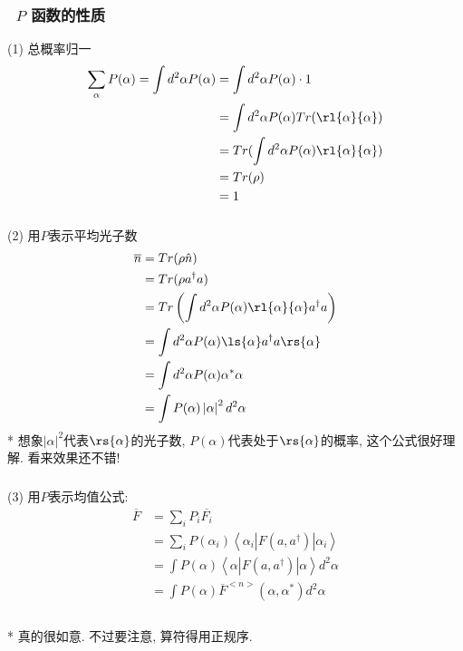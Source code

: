     \begin{frame} 
          \frametitle{~$P$ 函数的性质}    
    (1) 总概率归一
    \[ \begin{aligned}
       \sum_\alpha P(\alpha) = \int d^2 \alpha P(\alpha) &= \int d^2 \alpha P(\alpha) \cdot 1 \\ 
        &= \int d^2 \alpha P(\alpha) Tr(\rl{\alpha}{\alpha} ) \\ 
        &= Tr(\int d^2 \alpha P(\alpha) \rl{\alpha}{\alpha} )\\ 
        &= Tr(\rho)\\ 
        &=1
    \end{aligned}\] 
    \end{frame}
    
    \begin{frame} 
          \frametitle{}
    (2) 用$P$表示平均光子数
    \[ \begin{aligned}
        \overline{n} &= Tr(\rho \hat{n} ) \\ 
        &= Tr(\rho a^{\dagger} a )\\
        &=Tr\left(\int d^2 \alpha P(\alpha) \rl{\alpha}{\alpha}   a^{\dagger} a \right) \\
        &= \int d^2 \alpha P(\alpha) \ls{\alpha}   a^{\dagger} a \rs{\alpha} \\
        &= \int d^2 \alpha P(\alpha) \alpha^* \alpha \\ 
        &= \int P(\alpha) \left|\alpha\right|^2 d^2 \alpha \\ 
    \end{aligned}\] 
    * 想象$\left|\alpha\right|^2$代表$\rs{\alpha}$的光子数, $P(\alpha)$代表处于$\rs{\alpha}$的概率, 这个公式很好理解. 看来效果还不错!
   \end{frame}

   \begin{frame} 
   \frametitle{}
   (3) 用$P$表示均值公式:
   \[ \begin{aligned}
   \overline{F} &= \sum_i P_i \overline{F_i} \\ 
   &= \sum_i P(\alpha_i) \left\langle \alpha_i  |F(a, a^{\dagger}) | \alpha_i \right\rangle\\ 
   &= \int P(\alpha) \left\langle \alpha |F(a, a^{\dagger}) | \alpha\right\rangle d^2 \alpha \\ 
   &= \int P(\alpha) \overline{F}^{<n>} (\alpha, \alpha^*)   d^2 \alpha \\ 
 \end{aligned}\]
  ~\\
  * 真的很如意. 不过要注意, 算符得用正规序.
  \end{frame}

